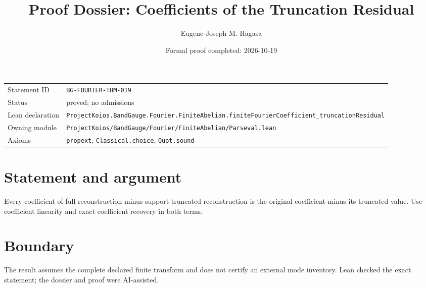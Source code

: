 \documentclass[11pt]{article}
\title{Proof Dossier: Coefficients of the Truncation Residual}
\author{Eugene Joseph M. Ragasa}
\date{Formal proof completed: 2026-10-19}
\begin{document}
\maketitle
\noindent\begin{tabularx}{\textwidth}{@{}lX@{}}\toprule
Statement ID & \texttt{BG-FOURIER-THM-019} \\
Status & proved; no admissions \\
Lean declaration & \texttt{ProjectKoios.BandGauge.Fourier.FiniteAbelian.}\newline\texttt{finiteFourierCoefficient\_truncationResidual} \\
Owning module & \texttt{ProjectKoios/BandGauge/Fourier/FiniteAbelian/Parseval.lean} \\
Axioms & \texttt{propext}, \texttt{Classical.choice}, \texttt{Quot.sound} \\
\bottomrule\end{tabularx}
\section{Statement and argument}
Every coefficient of full reconstruction minus support-truncated reconstruction is the original coefficient minus its truncated value. Use coefficient linearity and exact coefficient recovery in both terms.
\section{Boundary}
The result assumes the complete declared finite transform and does not certify an external mode inventory. Lean checked the exact statement; the dossier and proof were AI-assisted.
\end{document}
